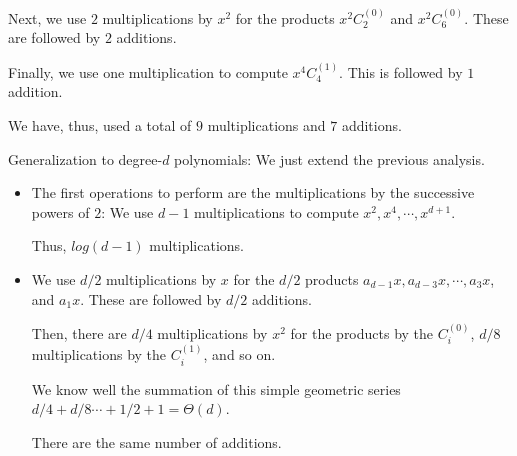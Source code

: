 \begin{itemize}
\begin{enumerate}
\begin{itemize}
Next, we use $2$ multiplications by $x^2$ for the products $x^2  C_2^{(0)}$ and $x^2  C_6^{(0)}$.  These are followed by $2$ additions.

Finally, we use one multiplication to compute $x^4 C_4^{(1)}$.  This is followed by $1$ addition.
\end{itemize}
We have, thus, used a total of $9$ multiplications and $7$ additions.

\medskip

Generalization to degree-$d$ polynomials: 
We just extend the previous analysis.
\begin{itemize}
\item
The first operations to perform are the multiplications by the successive powers of $2$:
We use $d-1$ multiplications to compute $x^2, x^4, \cdots, x^{d+1}$.

Thus, $log(d-1)$ multiplications.

\medskip\item
We use $d/2$ multiplications by $x$ for the $d/2$ products $a_{d-1} x, a_{d-3} x, \cdots, a_3 x$, and $a_1 x$.  
These are followed by $d/2$ additions.

Then, there are $d/4$ multiplications by $x^2$ for the products by the $C_{i}^{(0)}$,
$d/8$ multiplications by the $C_{i}^{(1)}$, and so on.

We know well the summation of this simple geometric series $d/4 + d/8 \cdots + 1/2 + 1 = \Theta(d)$.

There are the same number of additions. 

\end{itemize}
\end{enumerate}

\end{itemize}


